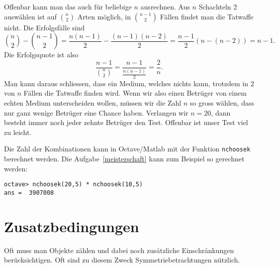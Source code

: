\begin{beispiele}
\begin{loesung}
Offenbar kann man das auch für beliebige $n$ ausrechnen.
Aus $n$
Schachteln $2$ auswählen ist auf $\binom{n}2$ Arten möglich, in
$\binom{n-1}2$ Fällen findet man die Tatwaffe nicht.
Die Erfolgsfälle
sind
\[
\binom{n}2-\binom{n-1}2
=\frac{n(n-1)}2-\frac{(n-1)(n-2)}2
=\frac{n-1}2(n-(n-2))=n-1.
\]
Die Erfolgsquote ist also
\[
\frac{n-1}{\displaystyle\binom{n}2}=\frac{n-1}{\displaystyle\frac{n(n-1)}2}=\frac2n.
\]
Man kann daraus schliessen, dass ein Medium, welches nichts kann,
trotzdem in $2$ von $n$ Fällen die Tatwaffe finden wird.
Wenn wir also einen Betrüger von einem echten Medium unterscheiden
wollen, müssen wir die Zahl $n$ so gross wählen, dass nur ganz
wenige Betrüger eine Chance haben.
Verlangen wir $n=20$, dann
besteht immer noch jeder zehnte Betrüger den Test.
Offenbar ist unser
Test viel zu leicht.
\end{loesung}

\end{beispiele}
Die Zahl der Kombinationen kann in Octave/Matlab mit der Funktion
{\tt nchoosek} berechnet werden.
Die Aufgabe~\ref{meisterschaft}
kann zum Beispiel so gerechnet werden:
\begin{verbatim}
octave> nchoosek(20,5) * nchoosek(10,5)
ans =  3907008
\end{verbatim}

\section{Zusatzbedingungen}
Oft muss man Objekte zählen und dabei noch zusätzliche Einschränkungen
berücksichtigen.
Oft sind zu diesem Zweck Symmetriebetrachtungen
nützlich.

